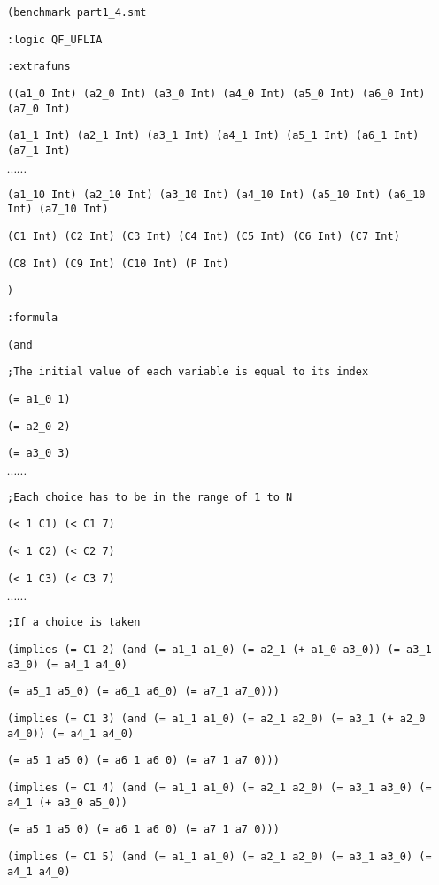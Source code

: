 {\footnotesize

{\tt (benchmark part1\_4.smt}

{\tt :logic QF\_UFLIA}

{\tt :extrafuns}

{\tt ((a1\_0 Int)  (a2\_0 Int)  (a3\_0 Int)  (a4\_0 Int)  (a5\_0 Int)  (a6\_0 Int)  (a7\_0 Int)}

{\tt (a1\_1 Int)  (a2\_1 Int)  (a3\_1 Int)  (a4\_1 Int)  (a5\_1 Int)  (a6\_1 Int)  (a7\_1 Int)}

$\cdots \cdots$

{\tt (a1\_10 Int) (a2\_10 Int) (a3\_10 Int) (a4\_10 Int) (a5\_10 Int) (a6\_10 Int) (a7\_10 Int)}

{\tt (C1 Int)    (C2 Int)    (C3 Int)    (C4 Int)    (C5 Int)    (C6 Int)    (C7 Int)}

{\tt (C8 Int)    (C9 Int)    (C10 Int)   (P Int)}

{\tt )}

{\tt :formula}

{\tt (and }

{\tt ;The initial value of each variable is equal to its index}

{\tt (= a1\_0 1)}

{\tt (= a2\_0 2)}

{\tt (= a3\_0 3)}

$\cdots \cdots$

{\tt ;Each choice has to be in the range of 1 to N}

{\tt (< 1 C1) (< C1 7)}

{\tt (< 1 C2) (< C2 7)}

{\tt (< 1 C3) (< C3 7)}

$\cdots \cdots$


{\tt ;If a choice is taken}

{\tt (implies (= C1 2)  (and (= a1\_1 a1\_0) (= a2\_1 (+ a1\_0 a3\_0)) (= a3\_1 a3\_0) (= a4\_1 a4\_0)}

{\tt (= a5\_1 a5\_0) (= a6\_1 a6\_0) (= a7\_1 a7\_0)))}

{\tt (implies (= C1 3)  (and (= a1\_1 a1\_0) (= a2\_1 a2\_0) (= a3\_1 (+ a2\_0 a4\_0)) (= a4\_1 a4\_0)}

{\tt (= a5\_1 a5\_0) (= a6\_1 a6\_0) (= a7\_1 a7\_0)))}

{\tt (implies (= C1 4)  (and (= a1\_1 a1\_0) (= a2\_1 a2\_0) (= a3\_1 a3\_0) (= a4\_1 (+ a3\_0 a5\_0))}

{\tt (= a5\_1 a5\_0) (= a6\_1 a6\_0) (= a7\_1 a7\_0)))}

{\tt (implies (= C1 5)  (and (= a1\_1 a1\_0) (= a2\_1 a2\_0) (= a3\_1 a3\_0) (= a4\_1 a4\_0)}

}
